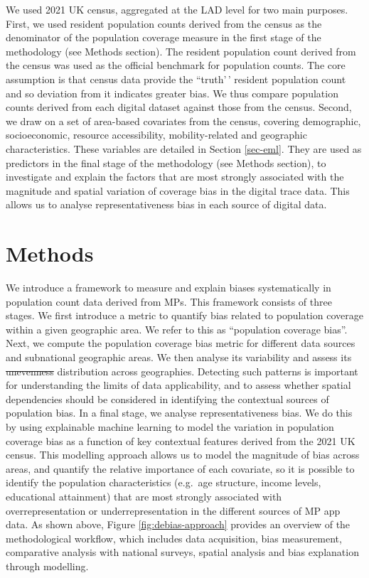 \documentclass[]{rsos}%
\providecommand{\DIFadd}[1]{{\protect\color{blue}\uwave{#1}}} %
\providecommand{\DIFdel}[1]{{\protect\color{red}\sout{#1}}}                      %
\providecommand{\DIFaddbegin}{} %
\providecommand{\DIFaddend}{} %
\providecommand{\DIFdelbegin}{} %
\providecommand{\DIFdelend}{} %
\begin{document}
We used 2021 UK census, aggregated at the LAD level for two main
purposes. First, we used resident population counts derived from the
census as the denominator of the population coverage measure in the
first stage of the methodology (see Methods section). The resident
population count derived from the census was used as the official
benchmark for population counts. The core assumption is that census data
provide the ``truth'\,' resident population count and so deviation from
it indicates greater bias. We thus compare population counts derived
from each digital dataset against those from the census. Second, we draw
on a set of area-based covariates from the census, covering demographic,
socioeconomic, resource accessibility, mobility-related and geographic
characteristics. These variables are detailed in Section \ref{sec-eml}.
They are used as predictors in the final stage of the methodology (see
Methods section), to investigate and explain the factors that are most
strongly associated with the magnitude and spatial variation of coverage
bias in the digital trace data. This allows us to analyse
representativeness bias in each source of digital data.

\section{Methods}\label{methods}

We introduce a framework to measure and explain biases systematically in
population count data derived from MPs. This framework consists of three
stages. We first introduce a metric to quantify bias related to
population coverage within a given geographic area. We refer to this as
``population coverage bias''. Next, we compute the population coverage
bias metric for different data sources and subnational geographic areas.
We then analyse its variability and assess its \DIFdelbegin \DIFdel{unevenness }\DIFdelend \DIFaddbegin \DIFadd{uneven spatial }\DIFaddend distribution
across geographies. Detecting such patterns is important for
understanding the limits of data applicability, and to assess whether
spatial dependencies should be considered in identifying the contextual
sources of population bias. In a final stage, we analyse
representativeness bias. We do this by using explainable machine
learning to model the variation in population coverage bias as a
function of key contextual features derived from the 2021 UK census.
This modelling approach allows us to model the magnitude of bias across
areas, and quantify the relative importance of each covariate, so it is
possible to identify the population characteristics (e.g.~age structure,
income levels, educational attainment) that are most strongly associated
with overrepresentation or underrepresentation in the different sources
of MP app data. As shown above, Figure \ref{fig:debias-approach}
provides an overview of the methodological workflow, which includes data
acquisition, bias measurement, comparative analysis with national
surveys, spatial analysis and bias explanation through modelling.
\end{document}
